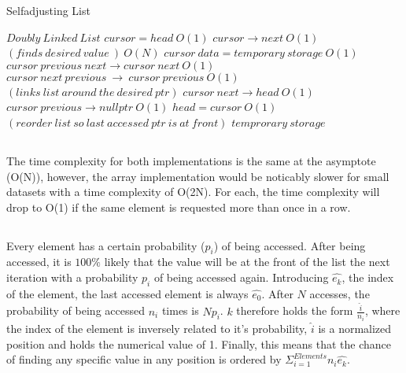 \documentclass[journal]{IEEEtran}
\begin{document}
~\\\\
~\\\\
~\\\\

\subsection{}
\begin{algorithm}
\caption{Selfadjusting List}
\begin{algorithmic}
	\REQUIRE $Doubly~Linked~List$
	\STATE $cursor = head~O(1)$
	\STATE $cursor \rightarrow next~O(1)$ \\ $(finds~desired~value~)~O(N)$
	\ENDWHILE 
	\STATE $cursor~data = temporary~storage~O(1)$
	\STATE $cursor~previous~next \rightarrow cursor~next~O(1)$
	\STATE $cursor~next~previous~\rightarrow~cursor~previous~O(1)$ \\ $(links~list~around~the~desired~ptr)$
	\STATE $cursor~next \rightarrow head~O(1)$
	\STATE $cursor~previous \rightarrow nullptr~O(1)$
	\STATE $head = cursor~O(1)$ \\ $(reorder~list~so~last~accessed~ptr~is~at~front)$
	\RETURN $temprorary~storage$
\end{algorithmic}
\end{algorithm}


\subsection{}
The time complexity for both implementations is the same at the asymptote (O(N)), however, the array implementation 
would be noticably slower for small datasets with a time complexity of O(2N). For each, the time complexity will 
drop to O(1) if the same element is requested more than once in a row.

\subsection{}
Every element has a certain probability ($p_i$) of being accessed. After being accessed, it is $100\%$ likely that 
the value will be at the front of the list the next iteration with a probability $p_i$ of being accessed again.
 Introducing $\hat{e_k}$, the index of the element, the last accessed element is always $\hat{e_0}$. After $N$ accesses, 
 the probability of being accessed $n_i$ times is $Np_i$. $k$ therefore holds the form $\frac{\hat{i}}{n_i}$, where the index
 of the element is inversely related to it's probability, $\hat{i}$ is a normalized position and holds the numerical 
 value of 1. Finally, this means that the chance of finding any specific value in any position is ordered 
 by $\boxed{\Sigma_{i = 1}^{Elements} n_i \hat{e_k}}$.
\end{document}
